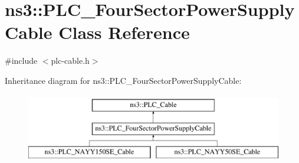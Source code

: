 \hypertarget{classns3_1_1PLC__FourSectorPowerSupplyCable}{\section{ns3\-:\-:\-P\-L\-C\-\_\-\-Four\-Sector\-Power\-Supply\-Cable \-Class \-Reference}
\label{classns3_1_1PLC__FourSectorPowerSupplyCable}
}


{\ttfamily \#include $<$plc-\/cable.\-h$>$}

\-Inheritance diagram for ns3\-:\-:\-P\-L\-C\-\_\-\-Four\-Sector\-Power\-Supply\-Cable\-:\begin{figure}[H]
\begin{center}
\leavevmode
\includegraphics[height=3.000000cm]{classns3_1_1PLC__FourSectorPowerSupplyCable}
\end{center}
\end{figure}
